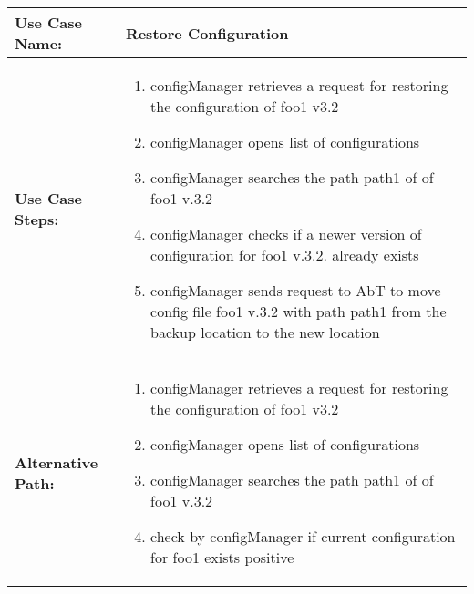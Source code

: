 
\begin{tabularx}{\linewidth}{|l|X|}
\hline
\textbf{Use Case Name:} & \textbf{Restore Configuration} \\
\hline
\textbf{Use Case Steps:} & 
\begin{minipage}{\linewidth} 
  \vspace{0.05em}
  \begin{enumerate}
	\item configManager retrieves a request for restoring the configuration of foo1 v3.2
	\item configManager opens list of configurations
	\item configManager searches the path path1 of of foo1 v.3.2
	\item configManager checks if a newer version of configuration for foo1 v.3.2. already exists 
	\item configManager sends request to AbT to move config file foo1 v.3.2 with path path1 from the backup location to the new location
  \end{enumerate}
  \vspace{0.05em}
\end{minipage}
\\
\hline 
\textbf{Alternative Path:} &
\begin{minipage}{\linewidth}
  \vspace{0.05em} 
  \begin{enumerate}
	\item configManager retrieves a request for restoring the configuration of foo1 v3.2
	\item configManager opens list of configurations
	\item configManager searches the path path1 of of foo1 v.3.2
	\item check by configManager if current configuration for foo1 exists positive
  \end{enumerate}
  \vspace{0.05em} 
\end{minipage}
\\
\hline
\end{tabularx}


